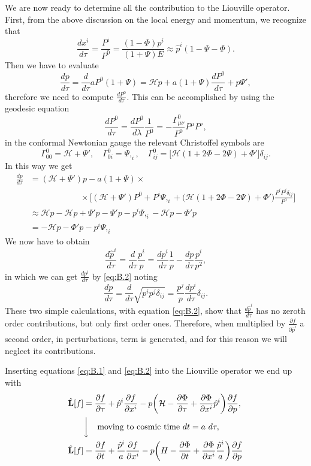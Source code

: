 We are now ready to determine all the contribution to the Liouville operator. First, from the above discussion on the local energy and momentum, we recognize that 
\begin{equation}\label{eq:B.1}
    \frac{dx^i}{d\tau}=\frac{P^i}{P^0}=\frac{(1-\Phi)p^i}{(1+\Psi)E}\approx \hat p^i(1-\Psi-\Phi).
\end{equation}
Then we have to evaluate $$\frac{dp}{d\tau}=\frac{d}{d\tau}aP^0(1+\Psi)=\mathcal{H}p+a(1+\Psi)\frac{dP^0}{d\tau}+p\Psi',$$
therefore we need to compute $\frac{dP^0}{d\tau}$. This can be accomplished by using the geodesic equation $$ \frac{dP^0}{d\tau}=\frac{dP^0}{d\lambda}\frac{1}{P^0}=-\frac{\Gamma^0_{\mu\nu}}{P^0}P^\mu P^\nu,$$
in the conformal Newtonian gauge the relevant Christoffel symbols are $$\Gamma^0_{00}=\mathcal{H}+\Psi',\quad\Gamma^0_{0i}=\Psi,_i,\quad\Gamma^0_{ij}=\bigg[\mathcal{H}(1+2\Phi-2\Psi)+\Phi' \bigg]\delta_{ij}.$$
In this way we get
\begin{align}\label{eq:B.2}
    \frac{dp}{d\tau}&=(\mathcal{H}+\Psi') p-a(1+\Psi)\times\nonumber\\&\qquad\qquad\qquad\times \bigg[(\mathcal{H} +\Psi')P^0+P^i\Psi,_i+\bigg(\mathcal{H}(1+2\Phi-2\Psi)+\Phi' \bigg)\frac{P^iP^j\delta_{ij}}{P^0} \bigg]\nonumber\\
    &\approx\mathcal{H} p-\mathcal{H} p+\Psi'p-\Psi'p-p^i\Psi,_i-\mathcal{H}p-\Phi'p\nonumber\\
    &=-\mathcal{H} p-\Phi' p-p^i\Psi,_i
\end{align}
We now have to obtain
$$\frac{d\hat p^i}{d\tau}=\frac{d}{d\tau}\frac{p^i}{p}=\frac{dp^i}{d\tau}\frac{1}{p}-\frac{dp}{d\tau}\frac{p^i}{p^2},$$
in which we can get $\frac{dp^i}{d\tau}$ by \eqref{eq:B.2} noting
$$\frac{dp}{d\tau}=\frac{d}{d\tau}\sqrt{p^ip^j\delta_{ij}}=\frac{p^j}{p}\frac{dp^i}{d\tau}\delta_{ij}.$$
These two simple calculations, with equation \eqref{eq:B.2}, show that $\frac{d\hat p^i}{d\tau}$ has no zeroth order contributions, but only first order ones. Therefore, when multiplied by $\frac{\partial f}{\partial \hat p^i}$ a second order, in perturbations, term is generated, and for this reason we will neglect its contributions.

Inserting equations \eqref{eq:B.1} and \eqref{eq:B.2} into the Liouville operator we end up with
\begin{align}\label{eq:Liouville_scalar_perturbed}
    \hat{\mathbf{L}}[f]&=\frac{\partial f}{\partial \tau}+\hat p^i\frac{\partial f}{\partial x^i}-p\bigg(\mathcal{H}-\frac{\partial \Phi}{\partial \tau}+\frac{\partial \Phi}{\partial x^i}\hat p^i\bigg)\frac{\partial f}{\partial p},\nonumber\\
    &\bigg\downarrow\quad\text{moving to cosmic time } dt=a\ d\tau,\nonumber\\
    \hat{\mathbf{L}}[f]&=\frac{\partial f}{\partial t}+\frac{\hat p^i}{a}\frac{\partial f}{\partial x^i}-p\bigg(H-\frac{\partial \Phi}{\partial t}+\frac{\partial \Phi}{\partial x^i}\frac{\hat p^i}{a}\bigg)\frac{\partial f}{\partial p}
\end{align}

